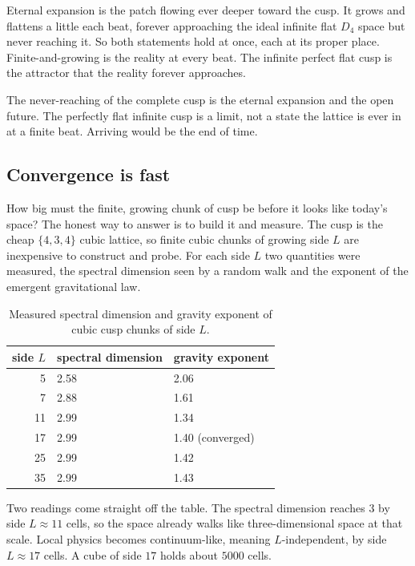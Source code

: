 Eternal expansion is the patch flowing ever deeper toward the cusp. It grows and flattens a little each beat, forever approaching the ideal infinite flat $D_4$ space but never reaching it. So both statements hold at once, each at its proper place. Finite-and-growing is the reality at every beat. The infinite perfect flat cusp is the attractor that the reality forever approaches.

\begin{result}
The never-reaching of the complete cusp is the eternal expansion and the open future. The perfectly flat infinite cusp is a limit, not a state the lattice is ever in at a finite beat. Arriving would be the end of time.
\end{result}

\subsection{Convergence is fast}

How big must the finite, growing chunk of cusp be before it looks like today's space? The honest way to answer is to build it and measure. The cusp is the cheap $\{4,3,4\}$ cubic lattice, so finite cubic chunks of growing side $L$ are inexpensive to construct and probe. For each side $L$ two quantities were measured, the spectral dimension seen by a random walk and the exponent of the emergent gravitational law.

\begin{table}[ht]
\centering
\begin{tabular}{@{}rll@{}}
\toprule
side $L$ & spectral dimension & gravity exponent \\
\midrule
5  & 2.58 & 2.06 \\
7  & 2.88 & 1.61 \\
11 & 2.99 & 1.34 \\
17 & 2.99 & 1.40 (converged) \\
25 & 2.99 & 1.42 \\
35 & 2.99 & 1.43 \\
\bottomrule
\end{tabular}
\caption{Measured spectral dimension and gravity exponent of cubic cusp chunks of side $L$.}
\label{tab:convergence}
\end{table}

Two readings come straight off the table. The spectral dimension reaches $3$ by side $L \approx 11$ cells, so the space already walks like three-dimensional space at that scale. Local physics becomes continuum-like, meaning $L$-independent, by side $L \approx 17$ cells. A cube of side $17$ holds about $5000$ cells.

